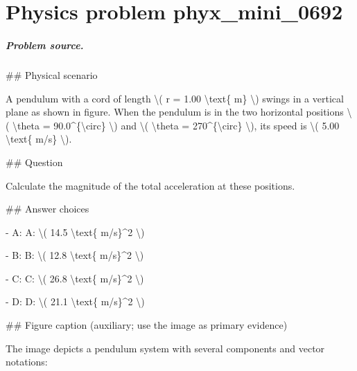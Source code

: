 
\chapter{Physics problem phyx\_mini\_0692}
\label{ch:PhyXMiniProblems_problem_phyx_mini_0692}

\paragraph{Problem source.}
\#\# Physical scenario

A pendulum with a cord of length \textbackslash{}( r = 1.00 \textbackslash{}text\{ m\} \textbackslash{}) swings in a vertical plane as shown in figure. When the pendulum is in the two horizontal positions \textbackslash{}( \textbackslash{}theta = 90.0\textasciicircum{}\{\textbackslash{}circ\} \textbackslash{}) and \textbackslash{}( \textbackslash{}theta = 270\textasciicircum{}\{\textbackslash{}circ\} \textbackslash{}), its speed is \textbackslash{}( 5.00 \textbackslash{}text\{ m/s\} \textbackslash{}).

\#\# Question

Calculate the magnitude of the total acceleration at these positions.

\#\# Answer choices

- A: A: \textbackslash{}( 14.5 \textbackslash{}text\{ m/s\}\textasciicircum{}2 \textbackslash{})

- B: B: \textbackslash{}( 12.8 \textbackslash{}text\{ m/s\}\textasciicircum{}2 \textbackslash{})

- C: C: \textbackslash{}( 26.8 \textbackslash{}text\{ m/s\}\textasciicircum{}2 \textbackslash{})

- D: D: \textbackslash{}( 21.1 \textbackslash{}text\{ m/s\}\textasciicircum{}2 \textbackslash{})

\#\# Figure caption (auxiliary; use the image as primary evidence)

The image depicts a pendulum system with several components and vector notations:

